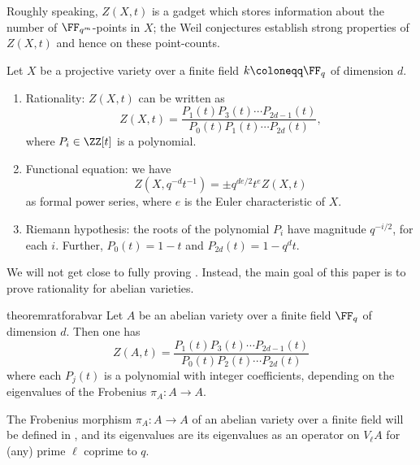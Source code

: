 \documentclass{amsart}
\begin{document}
	
Roughly speaking, $Z(X,t)$ is a gadget which stores information about the number of $\FF_{q^m}$-points in $X$; the Weil conjectures establish strong properties of $Z(X,t)$ and hence on these point-counts.
\begin{theorem} \label{thm:weil}
	Let $X$ be a projective variety over a finite field $k\coloneqq\FF_q$ of dimension $d$.
	\begin{enumerate}
		\item Rationality: $Z(X,t)$ can be written as
		\[Z(X,t)=\frac{P_1(t)P_3(t)\cdots P_{2d-1}(t)}{P_0(t)P_1(t)\cdots P_{2d}(t)},\]
		where $P_i\in\ZZ[t]$ is a polynomial.
		\item Functional equation: we have
		\[Z\left(X,q^{-d}t^{-1}\right)=\pm q^{de/2}t^eZ(X,t)\]
		as formal power series, where $e$ is the Euler characteristic of $X$.
		\item Riemann hypothesis: the roots of the polynomial $P_i$ have magnitude $q^{-i/2}$, for each $i$. Further, $P_0(t)=1-t$ and $P_{2d}(t)=1-q^dt$.
	\end{enumerate}
\end{theorem}
We will not get close to fully proving . Instead, the main goal of this paper is to prove rationality for abelian varieties.
\begin{restatable}[Rationality]{theorem}{ratforabvar} \label{thm:rationality}
	Let $A$ be an abelian variety over a finite field $\FF_q$ of dimension $d$. Then one has
	\[Z(A,t)=\frac{P_1(t)P_3(t)\cdots P_{2d-1}(t)}{P_0(t)P_2(t)\cdots P_{2d}(t)}\]
	where each $P_j(t)$ is a polynomial with integer coefficients, depending on the eigenvalues of the Frobenius $\pi_A\colon A\to A$.
\end{restatable}
The Frobenius morphism $\pi_A\colon A\to A$ of an abelian variety over a finite field will be defined in , and its eigenvalues are its eigenvalues as an operator on $V_\ell A$ for (any) prime $\ell$ coprime to $q$.
\end{document}
